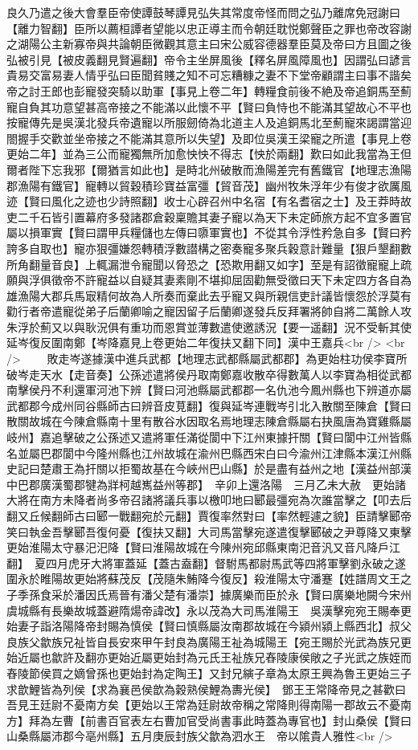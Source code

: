 良久乃遣之後大會羣臣帝使譚鼓琴譚見弘失其常度帝怪而問之弘乃離席免冠謝曰【離力智翻】臣所以薦桓譚者望能以忠正導主而令朝廷耽悦鄭聲臣之罪也帝改容謝之湖陽公主新寡帝與共論朝臣微觀其意主曰宋公威容德器羣臣莫及帝曰方且圖之後弘被引見【被皮義翻見賢遍翻】帝令主坐屏風後【釋名屏風障風也】因謂弘曰諺言貴易交富易妻人情乎弘曰臣聞貧賤之知不可忘糟糠之妻不下堂帝顧謂主曰事不諧矣　帝之討王郎也彭寵發突騎以助軍【事見上卷二年】轉糧食前後不絶及帝追銅馬至薊寵自負其功意望甚高帝接之不能滿以此懷不平【賢曰負恃也不能滿其望故心不平也按寵傳先是吳漢北發兵帝遺寵以所服劒倚為北道主人及追銅馬北至薊寵來謁謂當迎閤握手交歡並坐帝接之不能滿其意所以失望】及即位吳漢王梁寵之所遣【事見上卷更始二年】並為三公而寵獨無所加愈怏怏不得志【怏於兩翻】歎曰如此我當為王但爾者陛下忘我邪【爾猶言如此也】是時北州破散而漁陽差完有舊鐵官【地理志漁陽郡漁陽有鐵官】寵轉以貿穀積珍寶益富彊【貿音茂】幽州牧朱浮年少有俊才欲厲風迹【賢曰風化之迹也少詩照翻】收士心辟召州中名宿【有名耆宿之士】及王莽時故吏二千石皆引置幕府多發諸郡倉穀稟贍其妻子寵以為天下未定師旅方起不宜多置官屬以損軍實【賢曰謂甲兵糧儲也左傳曰隳軍實也】不從其令浮性矜急自多【賢曰矜誇多自取也】寵亦狠彊嫌怨轉積浮數譛構之密奏寵多聚兵穀意計難量【狠戶墾翻數所角翻量音良】上輒漏泄令寵聞以脅恐之【恐欺用翻又如字】至是有詔徵寵寵上疏願與浮俱徵帝不許寵益以自疑其妻素剛不堪抑屈固勸無受徵曰天下未定四方各自為雄漁陽大郡兵馬㝡精何故為人所奏而棄此去乎寵又與所親信吏計議皆懷怨於浮莫有勸行者帝遣寵從弟子后蘭卿喻之寵因留子后蘭卿遂發兵反拜署將帥自將二萬餘人攻朱浮於薊又以與耿況俱有重功而恩賞並薄數遣使邀誘況【要一遥翻】況不受斬其使延岑復反圍南鄭【岑降嘉見上卷更始二年復扶又翻下同】漢中王嘉兵<br />
<br />
　　敗走岑遂據漢中進兵武都【地理志武都縣屬武都郡】為更始柱功侯李寶所破岑走天水【走音奏】公孫述遣將侯丹取南鄭嘉收散卒得數萬人以李寶為相從武都南擊侯丹不利還軍河池下辨【賢曰河池縣屬武都郡一名仇池今鳳州縣也下辨道亦屬武都郡今成州同谷縣師古曰辨音皮莧翻】復與延岑連戰岑引北入散關至陳倉【賢曰散關故城在今陳倉縣南十里有散谷水因取名焉地理志陳倉縣屬右抉風唐為寶雞縣屬岐州】嘉追擊破之公孫述又遣將軍任滿從閬中下江州東據扞關【賢曰閬中江州皆縣名並屬巴郡閬中今隆州縣也江州故城在渝州巴縣西宋白曰今渝州江津縣本漢江州縣史記曰楚肅王為扞關以拒蜀故基在今峽州巴山縣】於是盡有益州之地【漢益州部漢中巴郡廣漢蜀郡犍為牂柯越嶲益州等郡】　辛卯上還洛陽　三月乙未大赦　更始諸大將在南方未降者尚多帝召諸將議兵事以檄叩地曰郾最彊宛為次誰當擊之【叩去后翻又丘候翻師古曰郾一戰翻宛於元翻】賈復率然對曰【率然輕遽之貌】臣請擊郾帝笑曰執金吾擊郾吾復何憂【復扶又翻】大司馬當擊宛遂遣復擊郾破之尹尊降又東擊更始淮陽太守暴汜汜降【賢曰淮陽故城在今陳州宛邱縣東南汜音汎又音凡降戶江翻】　夏四月虎牙大將軍蓋延【蓋古盍翻】督駙馬都尉馬武等四將軍擊劉永破之遂圍永於睢陽故更始將蘇茂反【茂隨朱鮪降今復反】殺淮陽太守潘蹇【姓譜周文王之子季孫食采於潘因氏焉晉有潘父楚有潘崇】據廣樂而臣於永【賢曰廣樂地闕今宋州虞城縣有長樂故城蓋避隋煬帝諱改】永以茂為大司馬淮陽王　吳漢擊宛宛王賜奉更始妻子詣洛陽降帝封賜為慎侯【賢曰慎縣屬汝南郡故城在今潁州潁上縣西北】叔父良族父歙族兄祉皆自長安來甲午封良為廣陽王祉為城陽王【宛王賜於光武為族兄更始近屬也歙許及翻亦更始近屬更始封為元氏王祉族兄舂陵康侯敞之子光武之族姪而舂陵節侯買之嫡曾孫也更始封為定陶王】又封兄縯子章為太原王興為魯王更始三子求歆鯉皆為列侯【求為襄邑侯歆為穀熟侯鯉為夀光侯】　鄧王王常降帝見之甚歡曰吾見王廷尉不憂南方矣【更始以王常為廷尉故帝稱之常降則得南陽一郡故云不憂南方】拜為左曹【前書百官表左右曹加官受尚書事此時蓋為專官也】封山桑侯【賢曰山桑縣屬沛郡今亳州縣】五月庚辰封族父歙為泗水王　帝以隂貴人雅性<br />
